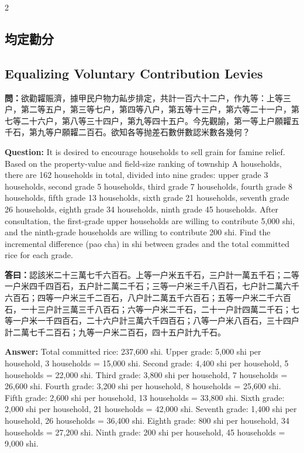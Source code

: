 \documentclass[11pt,a4paper]{article}
\newcommand{\QuestionText}[1]{\par\noindent\textbf{\color{problemcolor}問：}#1\par}
\newcommand{\AnswerText}[1]{\par\noindent\textbf{\color{answercolor}答曰：}#1\par}
\newcommand{\QuestionEn}[1]{\par\noindent\textbf{\color{problemcolor}Question:} #1\par}
\newcommand{\AnswerEn}[1]{\par\noindent\textbf{\color{answercolor}Answer:} #1\par}
\begin{document}
\begin{paracol}{2}

\subsection*{\color{sectioncolor}均定勸分}
\switchcolumn
\subsection*{\color{sectioncolor}Equalizing Voluntary Contribution Levies}
\switchcolumn*

\QuestionText{欲勸糶賑濟，據甲民户物力畆步排定，共計一百六十二户，作九等：上等三户，第二等五户，第三等七户，第四等八户，第五等十三户，第六等二十一户，第七等二十六户，第八等三十四户，第九等四十五户。今先觀諭，第一等上户願糶五千石，第九等户願糶二百石。欲知各等抛差石數併數認米數各幾何？}
\switchcolumn
\QuestionEn{It is desired to encourage households to sell grain for famine relief. Based on the property-value and field-size ranking of township A households, there are 162 households in total, divided into nine grades: upper grade 3 households, second grade 5 households, third grade 7 households, fourth grade 8 households, fifth grade 13 households, sixth grade 21 households, seventh grade 26 households, eighth grade 34 households, ninth grade 45 households. After consultation, the first-grade upper households are willing to contribute 5,000 shi, and the ninth-grade households are willing to contribute 200 shi. Find the incremental difference (pao cha) in shi between grades and the total committed rice for each grade.}
\switchcolumn*

\AnswerText{認該米二十三萬七千六百石。上等一户米五千石，三户計一萬五千石；二等一户米四千四百石，五户計二萬二千石；三等一户米三千八百石，七户計二萬六千六百石；四等一户米三千二百石，八户計二萬五千六百石；五等一户米二千六百石，一十三户計三萬三千八百石；六等一户米二千石，二十一户計四萬二千石；七等一户米一千四百石，二十六户計三萬六千四百石；八等一户米八百石，三十四户計二萬七千二百石；九等一户米二百石，四十五户計九千石。}
\switchcolumn
\AnswerEn{Total committed rice: 237,600 shi. Upper grade: 5,000 shi per household, 3 households = 15,000 shi. Second grade: 4,400 shi per household, 5 households = 22,000 shi. Third grade: 3,800 shi per household, 7 households = 26,600 shi. Fourth grade: 3,200 shi per household, 8 households = 25,600 shi. Fifth grade: 2,600 shi per household, 13 households = 33,800 shi. Sixth grade: 2,000 shi per household, 21 households = 42,000 shi. Seventh grade: 1,400 shi per household, 26 households = 36,400 shi. Eighth grade: 800 shi per household, 34 households = 27,200 shi. Ninth grade: 200 shi per household, 45 households = 9,000 shi.}
\switchcolumn*


\end{paracol}
\end{document}
